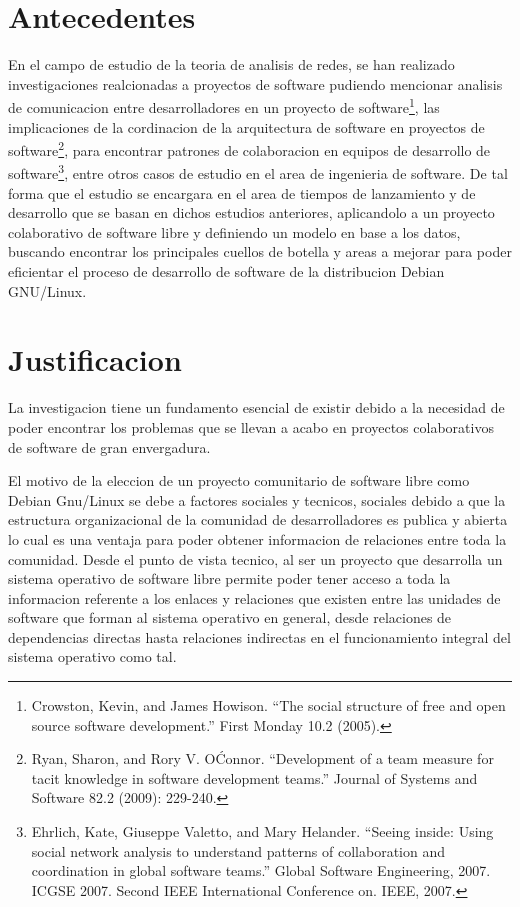 \documentclass[12pt]{report}
\begin{document}
\chapter*{Antecedentes}
En el campo de estudio de la teoria de analisis de redes, se han
realizado investigaciones realcionadas a proyectos de software
pudiendo mencionar analisis de comunicacion entre desarrolladores en
un proyecto de software\footnote{Crowston, Kevin, and James Howison.
  ``The social structure of free and open source software
  development.''  First Monday 10.2 (2005).}, las implicaciones de la
cordinacion de la arquitectura de software en proyectos de
software\footnote{Ryan, Sharon, and Rory V. O\'Connor. ``Development
  of a team measure for tacit knowledge in software development
  teams.'' Journal of Systems and Software 82.2 (2009): 229-240.},
para encontrar patrones de colaboracion en equipos de desarrollo de
software\footnote{Ehrlich, Kate, Giuseppe Valetto, and Mary
  Helander. ``Seeing inside: Using social network analysis to
  understand patterns of collaboration and coordination in global
  software teams.'' Global Software Engineering, 2007. ICGSE
  2007. Second IEEE International Conference on. IEEE, 2007.}, entre
otros casos de estudio en el area de ingenieria de software. De tal
forma que el estudio se encargara en el area de tiempos de lanzamiento
y de desarrollo que se basan en dichos estudios anteriores,
aplicandolo a un proyecto colaborativo de software libre y definiendo
un modelo en base a los datos, buscando encontrar los principales
cuellos de botella y areas a mejorar para poder eficientar el proceso
de desarrollo de software de la distribucion Debian GNU/Linux.

\chapter*{Justificacion}
La investigacion tiene un fundamento esencial de existir debido a la
necesidad de poder encontrar los problemas que se llevan a acabo en
proyectos colaborativos de software de gran envergadura.

El motivo de la eleccion de un proyecto comunitario de software libre
como Debian Gnu/Linux se debe a factores sociales y tecnicos, sociales
debido a que la estructura organizacional de la comunidad de
desarrolladores es publica y abierta lo cual es una ventaja para poder
obtener informacion de relaciones entre toda la comunidad. Desde el punto de
vista tecnico, al ser un proyecto que desarrolla un sistema operativo
de software libre permite poder tener acceso a toda la informacion
referente a los enlaces y relaciones que existen entre las unidades de
software que forman al sistema operativo en general, desde relaciones
de dependencias directas hasta relaciones indirectas en el
funcionamiento integral del sistema operativo como tal.
\end{document}
